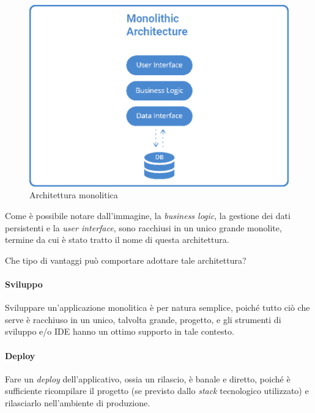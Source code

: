 \begin{figure}[H]
	\centering
	\includegraphics[width=\textwidth]{immagini/monolithic_architectureB.png} %
	\caption[Architettura monolitica]{Architettura monolitica\footnotemark}
	\label{fig:monolithic-arch}
\end{figure}

Come è possibile notare dall'immagine, la \textit{business logic}, la gestione dei dati persistenti e la \textit{user interface}, sono racchiusi in un unico grande monolite, termine da cui è stato tratto il nome di questa architettura.

Che tipo di vantaggi può comportare adottare tale architettura?


\paragraph*{Sviluppo} Sviluppare un'applicazione monolitica è per natura semplice, poiché tutto ciò che serve è racchiuso in un unico, talvolta grande, progetto, e gli strumenti di sviluppo e/o IDE 
hanno un ottimo supporto in tale contesto.

\paragraph*{Deploy} Fare un \textit{deploy} dell'applicativo, ossia un rilascio, è banale e diretto, poiché è sufficiente ricompilare il progetto (se previsto dallo \textit{stack} tecnologico utilizzato) e rilasciarlo nell'ambiente di produzione.

